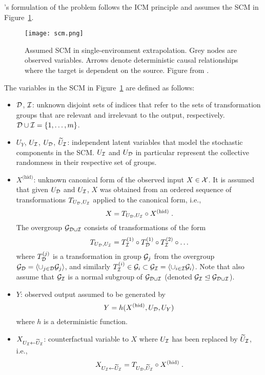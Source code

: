 \citeauthor{Mouli:2021}'s formulation of the problem follows the ICM principle \parencite{Parascandolo:2018} and assumes the SCM in Figure~\ref{fig:scm}.
\begin{figure}[H]
\centering
\texttt{[image: scm.png]}
\caption{Assumed SCM in single-environment extrapolation. Grey nodes are observed variables. Arrows denote deterministic causal relationships where the target is dependent on the source. Figure from \parencite{Mouli:2021}.}
\label{fig:scm}
\end{figure}
\noindent The variables in the SCM in Figure~\ref{fig:scm} are defined as follows:
\begin{itemize}

\item
$\mathcal{D}$, $\mathcal{I}$: unknown disjoint sets of indices that refer to the sets of transformation groups that are relevant and irrelevant to the output, respectively. $\mathcal{D}\cup\mathcal{I}=\{1,\ldots,m\}$.

\item
$U_Y$, $U_{\mathcal{I}}$, $U_{\mathcal{D}}$, $\widetilde{U}_{\mathcal{I}}$: independent latent variables that model the stochastic components in the SCM. $U_{\mathcal{I}}$ and $U_{\mathcal{D}}$ in particular represent the collective randomness in their respective set of groups.

\item
$X^{\text{(hid)}}$: unknown canonical form of the observed input $X\in\mathcal{X}$.  It is assumed that given $U_{\mathcal{D}}$ and $U_{\mathcal{I}}$, $X$ was obtained from an ordered sequence of transformations $T_{U_{\mathcal{D}},U_{\mathcal{I}}}$ applied to the canonical form, i.e.,
\[
X=T_{U_{\mathcal{D}},U_{\mathcal{I}}}\circ X^{\text{(hid)}}\;.
\]
The overgroup $\mathcal{G}_{\mathcal{D}\cup\mathcal{I}}$ consists of transformations of the form
\[
T_{U_{\mathcal{D}},U_{\mathcal{I}}}=T_{\mathcal{I}}^{(1)}\circ T_{\mathcal{D}}^{(1)}\circ T_{\mathcal{I}}^{(2)}\circ\ldots
\]
where $T_{\mathcal{D}}^{(j)}$ is a transformation in group $\mathcal{G}_j$ from the overgroup $\mathcal{G}_{\mathcal{D}}=\langle\cup_{j\in\mathcal{D}}\mathcal{G}_j\rangle$, and similarly $T_{\mathcal{I}}^{(i)}\in\mathcal{G}_i\subset\mathcal{G}_{\mathcal{I}}=\langle\cup_{i\in\mathcal{I}}\mathcal{G}_i\rangle$. Note that \citeauthor{Mouli:2021} also assume that $\mathcal{G}_{\mathcal{I}}$ is a normal subgroup of $\mathcal{G}_{\mathcal{D}\cup\mathcal{I}}$ (denoted $\mathcal{G}_{\mathcal{I}}\trianglelefteq\mathcal{G}_{\mathcal{D}\cup\mathcal{I}}$).

\item
$Y$: observed output assumed to be generated by
\[
Y = h(X^{\text{(hid)}},U_{\mathcal{D}},U_Y)
\]
where $h$ is a deterministic function.

\item
$X_{U_{\mathcal{I}}\leftarrow\widetilde{U}_{\mathcal{I}}}$: counterfactual variable to $X$ where $U_{\mathcal{I}}$ has been replaced by $\widetilde{U}_{\mathcal{I}}$, i.e.,
\[
X_{U_{\mathcal{I}}\leftarrow\widetilde{U}_{\mathcal{I}}} = T_{U_{\mathcal{D}},\widetilde{U}_{\mathcal{I}}}\circ X^{\text{(hid)}} \;.
\]

\end{itemize}


